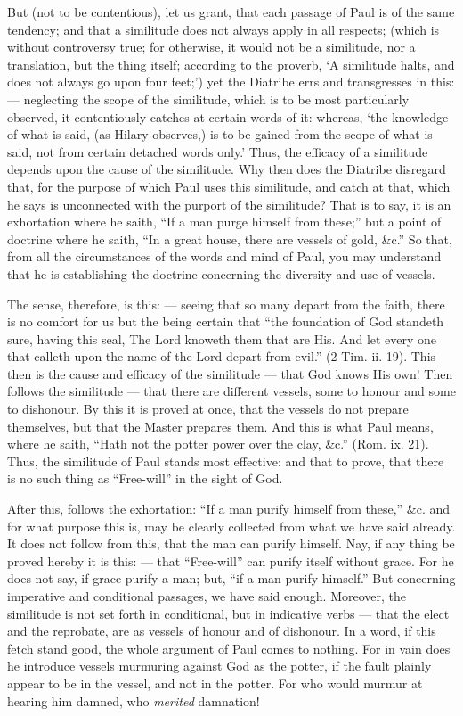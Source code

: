 But (not to be contentious), let us grant, that each passage of Paul is of the same tendency; and that a similitude does not always apply in all respects; (which is without controversy true; for otherwise, it would not be a similitude, nor a translation, but the thing itself; according to the proverb, ‘A similitude halts, and does not always go upon four feet;’) yet the Diatribe errs and transgresses in this: — neglecting the scope of the similitude, which is to be most particularly observed, it contentiously catches at certain words of it: whereas, ‘the knowledge of what is said, (as Hilary observes,) is to be gained from the scope of what is said, not from certain detached words only.’ Thus, the efficacy of a similitude depends upon the cause of the similitude. Why then does the Diatribe disregard that, for the purpose of which Paul uses this similitude, and catch at that, which he says is unconnected with the purport of the similitude? That is to say, it is an exhortation where he saith, “If a man purge himself from these;” but a point of doctrine where he saith, “In a great house, there are vessels of gold, \&c.” So that, from all the circumstances of the words and mind of Paul, you may understand that he is establishing the doctrine concerning the diversity and use of vessels.

The sense, therefore, is this: — seeing that so many depart from the faith, there is no comfort for us but the being certain that “the foundation of God standeth sure, having this seal, The Lord knoweth them that are His. And let every one that calleth upon the name of the Lord depart from evil.” (2 Tim. ii. 19). This then is the cause and efficacy of the similitude — that God knows His own! Then follows the similitude — that there are different vessels, some to honour and some to dishonour. By this it is proved at once, that the vessels do not prepare themselves, but that the Master prepares them. And this is what Paul means, where he saith, “Hath not the potter power over the clay, \&c.” (Rom. ix. 21). Thus, the similitude of Paul stands most effective: and that to prove, that there is no such thing as “Free-will” in the sight of God.

After this, follows the exhortation: “If a man purify himself from these,” \&c. and for what purpose this is, may be clearly collected from what we have said already. It does not follow from this, that the man can purify himself. Nay, if any thing be proved hereby it is this: — that “Free-will” can purify itself without grace. For he does not say, if grace purify a man; but, “if a man purify himself.” But concerning imperative and conditional passages, we have said enough. Moreover, the similitude is not set forth in conditional, but in indicative verbs — that the elect and the reprobate, are as vessels of honour and of dishonour. In a word, if this fetch stand good, the whole argument of Paul comes to nothing. For in vain does he introduce vessels murmuring against God as the potter, if the fault plainly appear to be in the vessel, and not in the potter. For who would murmur at hearing him damned, who \emph{merited }damnation!

